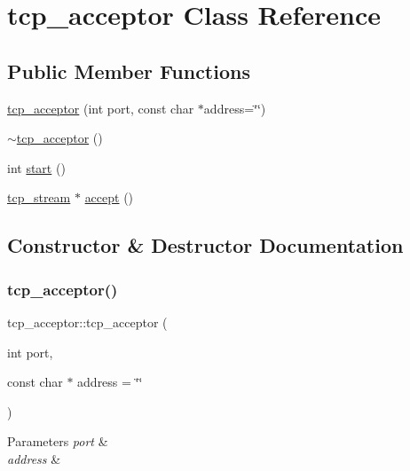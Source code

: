 \hypertarget{classtcp__acceptor}{}\section{tcp\+\_\+acceptor Class Reference}
\label{classtcp__acceptor}
\subsection*{Public Member Functions}
\begin{DoxyCompactItemize}
\item 
\hyperlink{classtcp__acceptor_acf72994db89d547554513076de9f2e66}{tcp\+\_\+acceptor} (int port, const char $\ast$address=\char`\"{}\char`\"{})
\item 
\hyperlink{classtcp__acceptor_a8110052284976750b47ec30b900956f2}{$\sim$tcp\+\_\+acceptor} ()
\item 
int \hyperlink{classtcp__acceptor_a15116195be2fa6d2b5f432cc0bdf0479}{start} ()
\item 
\hyperlink{classtcp__stream}{tcp\+\_\+stream} $\ast$ \hyperlink{classtcp__acceptor_a44b6f54d8d69d313091d3ae8991bf696}{accept} ()
\end{DoxyCompactItemize}


\subsection{Constructor \& Destructor Documentation}
\mbox{\label{classtcp__acceptor_acf72994db89d547554513076de9f2e66}} 
\subsubsection{\texorpdfstring{tcp\+\_\+acceptor()}{tcp\_acceptor()}}
{\footnotesize\ttfamily tcp\+\_\+acceptor\+::tcp\+\_\+acceptor (\begin{DoxyParamCaption}\item[{int}]{port,  }\item[{const char $\ast$}]{address = {\ttfamily \char`\"{}\char`\"{}} }\end{DoxyParamCaption})}


\begin{DoxyParams}{Parameters}
{\em port} & \\
\hline
{\em address} & \\
\hline
\end{DoxyParams}
\mbox{\label{classtcp__acceptor_a8110052284976750b47ec30b900956f2}} 
